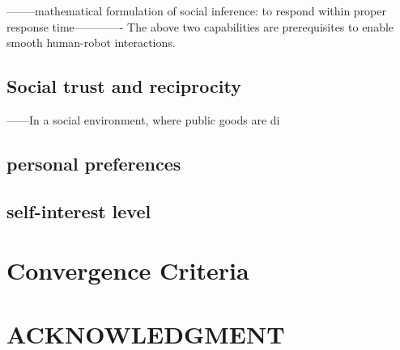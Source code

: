 \documentclass[letterpaper, 10 pt, conference]{ieeeconf}  %
\begin{document}
--------mathematical formulation of social inference: to respond within proper response time------------- 
The above two capabilities are prerequisites to enable smooth human-robot interactions. 
\subsection{Social trust and reciprocity}
------In a social environment, where public goods are di
\subsection{personal preferences}
\subsection{self-interest level}

\section{Convergence Criteria }







\section*{ACKNOWLEDGMENT}





\end{document}
